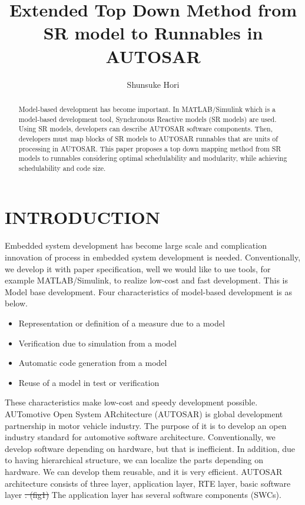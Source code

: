 \documentclass[conference,compsoc]{IEEEtran}
\title{Extended Top Down Method from SR model to Runnables in AUTOSAR}
\author{Shunsuke Hori}
\providecommand{\DIFadd}[1]{{\protect\color{blue}\uwave{#1}}} %
\providecommand{\DIFdel}[1]{{\protect\color{red}\sout{#1}}}                      %
\providecommand{\DIFaddbegin}{} %
\providecommand{\DIFaddend}{} %
\providecommand{\DIFdelbegin}{} %
\providecommand{\DIFdelend}{} %
\begin{document}
\maketitle

\begin{abstract}
 Model-based development has become important.
In MATLAB/Simulink which is a model-based development tool, Synchronous Reactive models (SR models) are used.
Using SR models, developers can describe AUTOSAR software components.
Then, developers must map blocks of SR models to AUTOSAR runnables that are units of processing in AUTOSAR.
This paper proposes a top down mapping method from SR models to runnables considering optimal schedulability and modularity, while achieving schedulability and code size.
\end{abstract}
	\section{INTRODUCTION}
 Embedded system development has become large scale and complication innovation of process in embedded system development is needed.
Conventionally, we develop it with paper specification, well we would like to use tools, for example MATLAB/Simulink, to realize low-cost and fast development.
This is Model base development.
Four characteristics of model-based development is as below.
	\begin{itemize}
		\item Representation or definition of a measure due to a model
		\item Verification due to simulation from a model
		\item Automatic code generation from a model
		\item Reuse of a model in test or verification
	\end{itemize} 
These characteristics make low-cost and speedy development possible.
 AUTomotive Open System ARchitecture (AUTOSAR) is global development partnership in motor vehicle industry.
The purpose of it is to develop an open industry standard for automotive software architecture.
Conventionally, we develop software depending on hardware, but that is inefficient.
In addition, due to having hierarchical structure, we can localize the parts depending on hardware.
We can develop them reusable, and it is very efficient. 
AUTOSAR architecture consists of three layer, application layer, RTE layer, basic software layer \DIFdelbegin \DIFdel{. (fig1)
 }\DIFdelend \DIFaddbegin \DIFadd{as shown Figure \ref{fig1}.
 }\DIFaddend The application layer has several software components (SWCs).
\end{document}
